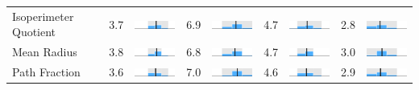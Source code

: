 \begin{table}
\begin{tabular}{l rm{7em} rm{7em} rm{7em} rm{7em}}
Isoperimeter Quotient  &   3.7 &       \includegraphics[width=7em]{mini_hist/WI_2004_polsby} &   6.9 &       \includegraphics[width=7em]{mini_hist/WI_2008_polsby} &   4.7 &       \includegraphics[width=7em]{mini_hist/WI_2012_polsby} &   2.8 &       \includegraphics[width=7em]{mini_hist/WI_2016_polsby} \\
Mean Radius            &   3.8 &  \includegraphics[width=7em]{mini_hist/WI_2004_mean_radius} &   6.8 &  \includegraphics[width=7em]{mini_hist/WI_2008_mean_radius} &   4.7 &  \includegraphics[width=7em]{mini_hist/WI_2012_mean_radius} &   3.0 &  \includegraphics[width=7em]{mini_hist/WI_2016_mean_radius} \\
Path Fraction          &   3.6 &    \includegraphics[width=7em]{mini_hist/WI_2004_path_frac} &   7.0 &    \includegraphics[width=7em]{mini_hist/WI_2008_path_frac} &   4.6 &    \includegraphics[width=7em]{mini_hist/WI_2012_path_frac} &   2.9 &    \includegraphics[width=7em]{mini_hist/WI_2016_path_frac} \\

\end{tabular}
\end{table}
